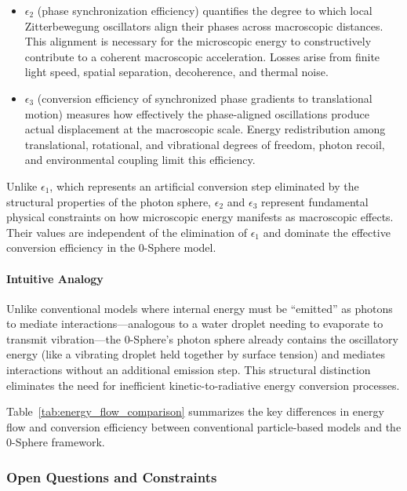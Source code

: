 \documentclass[
 reprint,
 amsmath,amssymb,
 aps,
 prb,
]{revtex4-2}
\numberwithin{equation}{section}
\begin{document}
\begin{itemize}
\item $\epsilon_2$ (phase synchronization efficiency) quantifies the degree to which local Zitterbewegung oscillators align their phases across macroscopic distances. This alignment is necessary for the microscopic energy to constructively contribute to a coherent macroscopic acceleration. Losses arise from finite light speed, spatial separation, decoherence, and thermal noise.

\item $\epsilon_3$ (conversion efficiency of synchronized phase gradients to translational motion) measures how effectively the phase-aligned oscillations produce actual displacement at the macroscopic scale. Energy redistribution among translational, rotational, and vibrational degrees of freedom, photon recoil, and environmental coupling limit this efficiency.
\end{itemize}

Unlike $\epsilon_1$, which represents an artificial conversion step eliminated by the structural properties of the photon sphere, $\epsilon_2$ and $\epsilon_3$ represent fundamental physical constraints on how microscopic energy manifests as macroscopic effects. Their values are independent of the elimination of $\epsilon_1$ and dominate the effective conversion efficiency in the 0-Sphere model.

\vspace{0.5cm}

\paragraph{Intuitive Analogy}

Unlike conventional models where internal energy must be ``emitted'' as photons to mediate interactions—analogous to a water droplet needing to evaporate to transmit vibration—the 0-Sphere's photon sphere already contains the oscillatory energy (like a vibrating droplet held together by surface tension) and mediates interactions without an additional emission step. This structural distinction eliminates the need for inefficient kinetic-to-radiative energy conversion processes.

Table~\ref{tab:energy_flow_comparison} summarizes the key differences in energy flow and conversion efficiency between conventional particle-based models and the 0-Sphere framework.

\subsubsection{Open Questions and Constraints}
\end{document}
